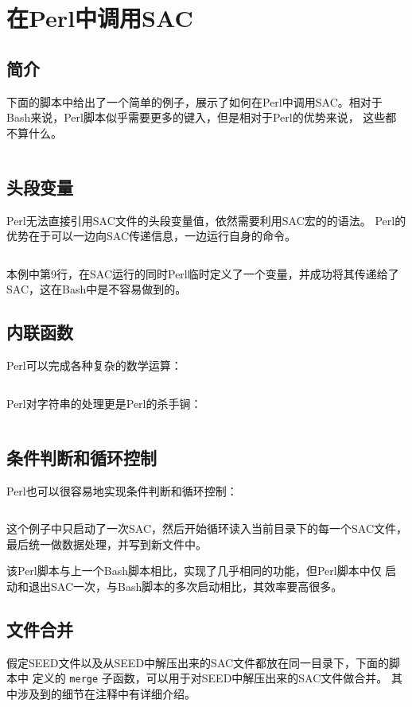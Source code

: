 \section{在Perl中调用SAC}
\label{sec:sac-perl}

\subsection{简介}
下面的脚本中给出了一个简单的例子，展示了如何在Perl中调用SAC。相对于
Bash来说，Perl脚本似乎需要更多的键入，但是相对于Perl的优势来说，
这些都不算什么。
\inputminted{perl}{./call-in-script/simple-script.pl}

\subsection{头段变量}
Perl无法直接引用SAC文件的头段变量值，依然需要利用SAC宏的的语法。
Perl的优势在于可以一边向SAC传递信息，一边运行自身的命令。
\inputminted{perl}{./call-in-script/variables.pl}
本例中第9行，在SAC运行的同时Perl临时定义了一个变量，并成功将其传递给了
SAC，这在Bash中是不容易做到的。

\subsection{内联函数}
Perl可以完成各种复杂的数学运算：
\inputminted{perl}{./call-in-script/arithmetic-functions.pl}

Perl对字符串的处理更是Perl的杀手锏：
\inputminted{perl}{./call-in-script/string-functions.pl}

\subsection{条件判断和循环控制}
Perl也可以很容易地实现条件判断和循环控制：
\inputminted{perl}{./call-in-script/do-loops.pl}
这个例子中只启动了一次SAC，然后开始循环读入当前目录下的每一个SAC文件，
最后统一做数据处理，并写到新文件中。

该Perl脚本与上一个Bash脚本相比，实现了几乎相同的功能，但Perl脚本中仅
启动和退出SAC一次，与Bash脚本的多次启动相比，其效率要高很多。

\subsection{文件合并}
\label{subsec:merge-in-perl}
假定SEED文件以及从SEED中解压出来的SAC文件都放在同一目录下，下面的脚本中
定义的 \texttt{merge} 子函数，可以用于对SEED中解压出来的SAC文件做合并。
其中涉及到的细节在注释中有详细介绍。
\inputminted{perl}{./call-in-script/merge.pl}

